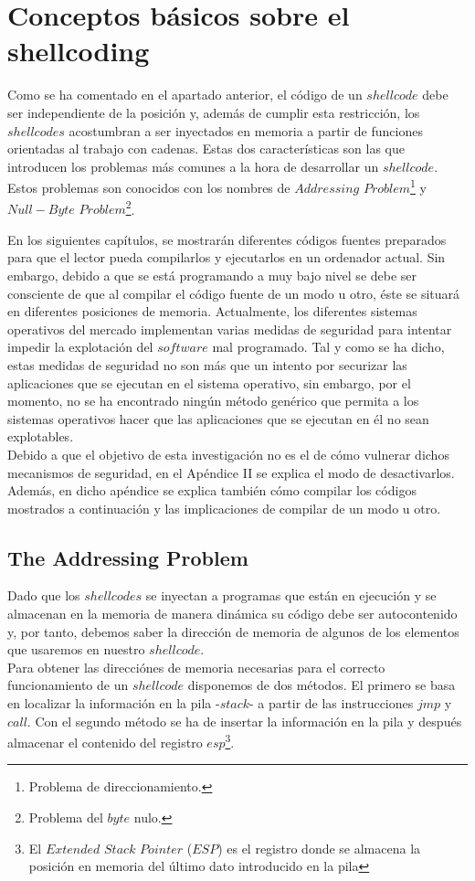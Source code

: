 \documentclass [titlepage, 12pt]{article}
\begin{document}
\newpage
\section{Conceptos b\'asicos sobre el shellcoding}
Como se ha comentado en el apartado anterior, el c\'odigo de un $shellcode$ debe ser independiente de la posici\'on y, adem\'as de cumplir esta restricci\'on, los $shellcodes$ acostumbran a ser inyectados en memoria a partir de funciones orientadas al trabajo con cadenas. Estas dos caracter\'isticas son las que introducen los problemas m\'as comunes a la hora de desarrollar un $shellcode$. Estos problemas son conocidos con los nombres de $Addressing$ $Problem$\footnote{Problema de direccionamiento.} y $Null-Byte$ $Problem$\footnote{Problema del $byte$ nulo.}. \bigskip

En los siguientes cap\'itulos, se mostrar\'an diferentes c\'odigos fuentes preparados para que el lector pueda compilarlos y ejecutarlos en un ordenador actual. Sin embargo, debido a que se est\'a programando a muy bajo nivel se debe ser consciente de que al compilar el c\'odigo fuente de un modo u otro, \'este se situar\'a en diferentes posiciones de memoria. Actualmente, los diferentes sistemas operativos del mercado implementan varias medidas de seguridad para intentar impedir la explotaci\'on del $software$ mal programado. Tal y como se ha dicho, estas medidas de seguridad no son m\'as que un intento por securizar las aplicaciones que se ejecutan en el sistema operativo, sin embargo, por el momento, no se ha encontrado ning\'un m\'etodo gen\'erico que permita a los sistemas operativos hacer que las aplicaciones que se ejecutan en \'el no sean explotables.\\
Debido a que el objetivo de esta investigaci\'on no es el de c\'omo vulnerar dichos mecanismos de seguridad, en el Ap\'endice II se explica el modo de desactivarlos. Adem\'as, en dicho ap\'endice se explica tambi\'en c\'omo compilar los c\'odigos mostrados a continuaci\'on y las implicaciones de compilar de un modo u otro.

\subsection{The Addressing Problem}
Dado que los $shellcodes$ se inyectan a programas que est\'an en ejecuci\'on y se almacenan en la memoria de manera din\'amica su c\'odigo debe ser autocontenido y, por tanto, debemos saber la direcci\'on de memoria de algunos de los elementos que usaremos en nuestro $shellcode$.\\
Para obtener las direcci\'ones de memoria necesarias para el correcto funcionamiento de un $shellcode$ disponemos de dos m\'etodos. El primero se basa en localizar la informaci\'on en la pila -$stack$- a partir de las instrucciones $jmp$ y $call$. Con el segundo m\'etodo se ha de insertar la informaci\'on en la pila y despu\'es almacenar el contenido del registro $esp$\footnote{El $Extended$ $Stack$ $Pointer$ ($ESP$) es el registro donde se almacena la posici\'on en memoria del \'ultimo dato introducido en la pila}.
\end{document}
